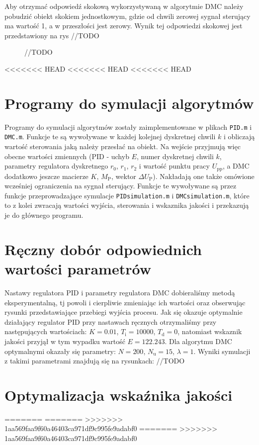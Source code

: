 Aby otrzymać odpowiedź skokową wykorzystywaną w algorytmie DMC należy pobudzić obiekt skokiem jednostkowym, gdzie od chwili zerowej sygnał sterujący ma wartość 1, a w przeszłości jest zerowy. Wynik tej odpowiedzi skokowej jest przedstawiony na rys //TODO
\begin{figure}
	//TODO
\end{figure}
<<<<<<< HEAD
<<<<<<< HEAD
<<<<<<< HEAD

\section{Programy do symulacji algorytmów}
Programy do symulacji algorytmów zostały zaimplementowane w plikach \texttt{PID.m} i \texttt{DMC.m}. Funkcje te są wywoływane w każdej kolejnej dyskretnej chwili $k$ i obliczają wartość sterowania jaką należy przesłać na obiekt. Na wejście przyjmują więc obecne wartości zmiennych (PID - uchyb $E$, numer dyskretnej chwili $k$, parametry regulatora dyskretnego $r_{\mathrm{0}}$, $r_{\mathrm{1}}$, $r_{\mathrm{2}}$ i wartość punktu pracy $U_{\mathrm{pp}}$, a DMC dodatkowo jeszcze macierze $K$, $M_{\mathrm{P}}$, wektor $\Delta U_{\mathrm{P}}$). Nakładają one także omówione wcześniej ograniczenia na sygnał sterujący. Funkcje te wywoływane są przez funkcje przeprowadzające symulacje \texttt{PIDsimulation.m} i \texttt{DMCsimulation.m}, które to z kolei zwracają wartości wyjścia, sterowania i wskaznika jakości i przekazują je do głównego programu.

\section{Ręczny dobór odpowiednich wartości parametrów}
Nastawy regulatora PID i parametry regulatora DMC dobieraliśmy metodą eksperymentalną, tj powoli i cierpliwie zmieniając ich wartości oraz obserwując rysunki przedstawiające przebiegi wyjścia procesu. Jak się okazuje optymalnie działający regulator PID przy nastawach ręcznych otrzymaliśmy przy następujących wartościach: $K=\num{0.01}$, $T_\mathrm{i}=10000$, $T_\mathrm{d}=0$, natomiast wskaznik jakości przyjął w tym wypadku wartość $E=\num{122.243}$. Dla algorytmu DMC optymalnymi okazały się parametry: $N=200$, $N_\mathrm{u}=15$, $\lambda=1$. Wyniki symulacji z takimi parametrami znajdują się na rysunkach: //TODO
\section{Optymalizacja wskaźnika jakości}
=======
=======
>>>>>>> 1aa569faa9f60a46403ca971df9c995fe9adabf0
=======
>>>>>>> 1aa569faa9f60a46403ca971df9c995fe9adabf0

